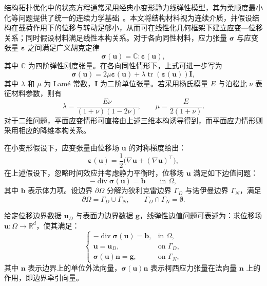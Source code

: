 结构拓扑优化中的状态方程通常采用经典小变形静力线弹性模型，其为柔顺度最小化等问题提供了统一的连续力学基础~\cite{bendsoeTopologyOptimization2004a}。本文将结构材料视为连续介质，并假设结构在载荷作用下的位移与转动足够小，从而可在线性化几何框架下建立应变—位移关系；同时假设材料满足线性本构关系。对于各向同性材料，应力张量 $\boldsymbol{\sigma}$ 与应变张量 $\boldsymbol{\varepsilon}$ 之间满足广义胡克定律
\[
\boldsymbol{\sigma}(\boldsymbol{u}) = \mathbb{C}:\boldsymbol{\varepsilon}(\boldsymbol{u}),
\]
其中 $\mathbb{C}$ 为四阶弹性刚度张量。在各向同性情形下，上式可进一步写为
\begin{equation}
	\boldsymbol{\sigma}(\boldsymbol{u}) = 2\mu \boldsymbol{\varepsilon}(\boldsymbol{u}) + \lambda \operatorname{tr}(\boldsymbol{\varepsilon}(\boldsymbol{u}))\boldsymbol{I},
	\label{eq:ch3_constitutive_equation}
\end{equation}
其中 $\lambda$ 和 $\mu$ 为 Lamé 常数，$\boldsymbol{I}$ 为二阶单位张量。若采用杨氏模量 $E$ 与泊松比 $\nu$ 表征材料参数，则有
\[
\lambda = \frac{E\nu}{(1+\nu)(1-2\nu)}, \qquad \mu = \frac{E}{2(1+\nu)}.
\]
对于二维问题，平面应变情形可直接由上述三维本构诱导得到，而平面应力情形则采用相应的降维本构关系。

在小变形假设下，应变张量由位移场 $\boldsymbol{u}$ 的对称梯度给出：
\[
\boldsymbol{\varepsilon}(\boldsymbol{u}) = \frac{1}{2}\bigl(\nabla\boldsymbol{u} + (\nabla\boldsymbol{u})^{\top}\bigr),
\]
在上述假设下，忽略时间效应并考虑静力平衡时，位移场 $\boldsymbol{u}$ 满足如下边值问题：
\begin{equation}
	-\operatorname{div}\boldsymbol{\sigma}(\boldsymbol{u})=\boldsymbol{b} \qquad \text{in } \Omega,
	\label{eq:ch3_equilibrium_equation}
\end{equation}
其中 $\boldsymbol{b}$ 表示体力项。设边界 $\partial\Omega$ 分解为狄利克雷边界 $\Gamma_D$ 与诺伊曼边界 $\Gamma_N$，满足
\[
\partial\Omega=\Gamma_D\cup\Gamma_N, \qquad \Gamma_D\cap\Gamma_N=\emptyset.
\]

给定位移边界数据 $\boldsymbol{u}_D$ 与表面力边界数据 $\boldsymbol{g}$，线弹性边值问题可表述为：求位移场 $\boldsymbol{u}:\Omega\to\mathbb{R}^d$，使其满足：
\begin{equation}
	\begin{cases}
		-\operatorname{div}\boldsymbol{\sigma}(\boldsymbol{u}) = \boldsymbol{b}, & \text{in } \Omega, \\
		\boldsymbol{u} = \boldsymbol{u}_D, & \text{on } \Gamma_D, \\
		\boldsymbol{\sigma}(\boldsymbol{u})\boldsymbol{n} = \boldsymbol{g}, & \text{on } \Gamma_N,
	\end{cases}
	\label{eq:ch3_elastic_strong}
\end{equation}
其中 $\boldsymbol{n}$ 表示边界上的单位外法向量，$\boldsymbol{\sigma}(\boldsymbol{u})\boldsymbol{n}$ 表示柯西应力张量在法向量 $\boldsymbol{n}$ 上的作用，即边界牵引向量。



